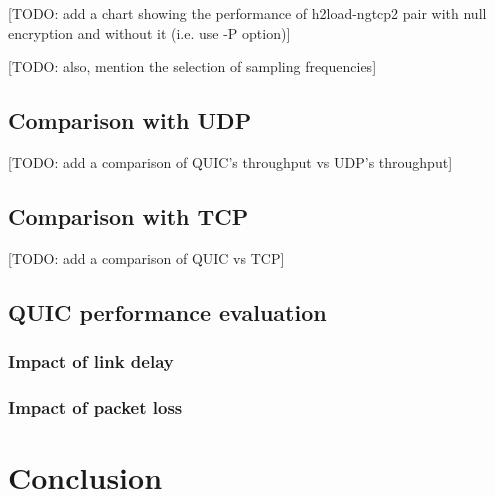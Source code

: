\documentclass[12pt,a4paper,twoside,openright]{report}
\begin{document}


[TODO: add a chart showing the performance of h2load-ngtcp2 pair with null encryption and without it (i.e. use -P option)]

[TODO: also, mention the selection of sampling frequencies]


\section{Comparison with UDP}
[TODO: add a comparison of QUIC's throughput vs UDP's throughput]


\section{Comparison with TCP}
[TODO: add a comparison of QUIC vs TCP]




\section{QUIC performance evaluation}


\subsection{Impact of link delay}



\subsection{Impact of packet loss}


\chapter{Conclusion}


\end{document}
